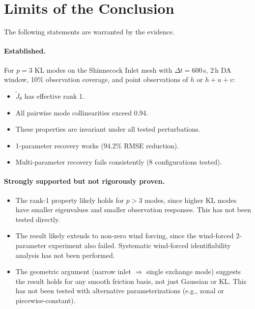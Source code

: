 \documentclass[11pt]{article}
\theoremstyle{definition}
\begin{document}
\section{Limits of the Conclusion}
\label{sec:limits}

The following statements are warranted by the evidence.

\paragraph{Established.}
For $p = 3$ KL modes on the Shinnecock Inlet mesh with
$\Delta t = 600\,$s, 2\,h DA window, 10\% observation coverage,
and point observations of $h$ or $h{+}u{+}v$:
\begin{itemize}
\item $\widetilde{J}_\theta$ has effective rank 1.
\item All pairwise mode collinearities exceed 0.94.
\item These properties are invariant under all tested perturbations.
\item 1-parameter recovery works (94.2\% RMSE reduction).
\item Multi-parameter recovery fails consistently (8 configurations tested).
\end{itemize}

\paragraph{Strongly supported but not rigorously proven.}
\begin{itemize}
\item The rank-1 property likely holds for $p > 3$ modes, since
  higher KL modes have smaller eigenvalues and smaller observation
  responses.  This has not been tested directly.
\item The result likely extends to non-zero wind forcing, since the
  wind-forced 2-parameter experiment also failed.  Systematic
  wind-forced identifiability analysis has not been performed.
\item The geometric argument (narrow inlet $\Rightarrow$ single
  exchange mode) suggests the result holds for any smooth friction
  basis, not just Gaussian or KL.  This has not been tested with
  alternative parameterizations (e.g., zonal or piecewise-constant).
\end{itemize}
\end{document}
